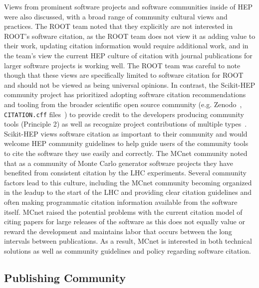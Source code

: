 Views from prominent software projects and software communities inside of HEP were also discussed, with a broad range of community cultural views and practices.
The ROOT team noted that they explicitly are not interested in ROOT's software citation, as the ROOT team does not view it as adding value to their work, updating citation information would require additional work, and in the team's view the current HEP culture of citation with journal publications for larger software projects is working well.
The ROOT team was careful to note though that these views are specifically limited to software citation for ROOT~\cite{Brun:1997pa} and should not be viewed as being universal opinions.
In contrast, the Scikit-HEP community project has prioritized adopting software citation recommendations and tooling from the broader scientific open source community (e.g. Zenodo~\cite{zenodo}, \texttt{CITATION.cff} files~\cite{Druskat_Citation_File_Format_2021}) to provide credit to the developers producing community tools (Principle 2) as well as recognize project contributions of multiple types~\cite{all-contributors}.
Scikit-HEP views software citation as important to their community and would welcome HEP community guidelines to help guide users of the community tools to cite the software they use easily and correctly.
The MCnet community noted that as a community of Monte Carlo generator software projects they have benefited from consistent citation by the LHC experiments.
Several community factors lead to this culture, including the MCnet community becoming organized in the leadup to the start of the LHC and providing clear citation guidelines and often making programmatic citation information available from the software itself.
MCnet raised the potential problems with the current citation model of citing papers for large releases of the software as this does not equally value or reward the development and maintains labor that occurs between the long intervals between publications.
As a result, MCnet is interested in both technical solutions as well as community guidelines and policy regarding software citation.


\subsection{Publishing Community}\label{sec:publishers}

